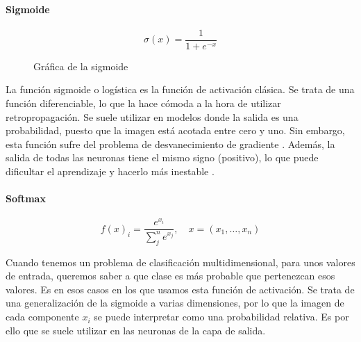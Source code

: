 \documentclass[11pt,twoside,titlepage,a4paper]{article}
\numberwithin{equation}{section} %
\theoremstyle{usual}
\begin{document}
\paragraph{Sigmoide}
\begin{equation}
    \sigma(x)=\displaystyle\frac{1}{1+e^{-x}}
\end{equation}

\begin{figure}[!h]
    \centering
    \caption{Gráfica de la sigmoide}
\end{figure}

La función sigmoide o logística es la función de activación clásica. Se trata
de una función diferenciable, lo que la hace cómoda a la hora de utilizar
retropropagación. Se suele utilizar en modelos donde la salida es una
probabilidad, puesto que la imagen está acotada entre cero y uno. Sin embargo,
esta función sufre del problema de desvanecimiento de gradiente . 
Además, la salida de todas las neuronas tiene el mismo signo (positivo), lo que
puede dificultar el aprendizaje y hacerlo más inestable \cite{activation}.\\

\paragraph{Softmax}
\begin{equation}
f(x)_i=\displaystyle\frac{e^{x_i}}{\sum_j^n e^{x_j}},\quad
x=(x_1,\ldots,x_n)
\end{equation}

Cuando tenemos un problema de clasificación multidimensional, para unos valores
de entrada, queremos saber a que clase es más probable que pertenezcan esos
valores. Es en esos casos en los que usamos esta función de activación. Se
trata de una generalización de la sigmoide a varias dimensiones, por lo que
la imagen de cada componente $x_i$ se puede interpretar como una probabilidad
relativa. Es por ello que se suele utilizar en las neuronas de la capa de
salida.\\
\end{document}
